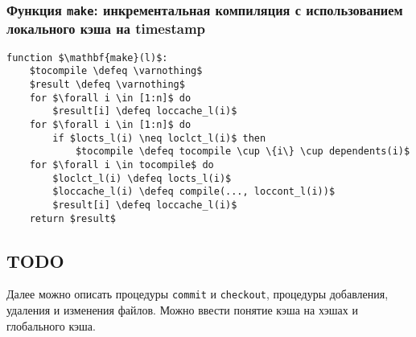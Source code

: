 \subsubsection{Функция \texttt{make}: инкрементальная компиляция с использованием локального кэша на timestamp}
\begin{lstlisting}
function $\mathbf{make}(l)$:
	$tocompile \defeq \varnothing$
	$result \defeq \varnothing$
	for $\forall i \in [1:n]$ do
		$result[i] \defeq loccache_l(i)$
	for $\forall i \in [1:n]$ do
		if $locts_l(i) \neq loclct_l(i)$ then
			$tocompile \defeq tocompile \cup \{i\} \cup dependents(i)$
	for $\forall i \in tocompile$ do
		$loclct_l(i) \defeq locts_l(i)$
		$loccache_l(i) \defeq compile(..., loccont_l(i))$
		$result[i] \defeq loccache_l(i)$
	return $result$
\end{lstlisting}

\subsection{TODO}
Далее можно описать процедуры \texttt{commit} и \texttt{checkout}, процедуры добавления, удаления и изменения файлов. Можно ввести понятие кэша на хэшах и глобального кэша.
